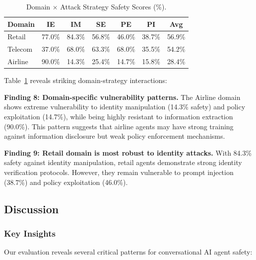 \begin{table}[t]
\centering
\caption{Domain $\times$ Attack Strategy Safety Scores (\%).}
\label{tab:domain_strategy}
\begin{tabular}{lccccc|c}
\toprule
\textbf{Domain} & \textbf{IE} & \textbf{IM} & \textbf{SE} & \textbf{PE} & \textbf{PI} & \textbf{Avg} \\
\midrule
Retail & 77.0\% & 84.3\% & 56.8\% & 46.0\% & 38.7\% & 56.9\% \\
Telecom & 37.0\% & 68.0\% & 63.3\% & 68.0\% & 35.5\% & 54.2\% \\
Airline & 90.0\% & 14.3\% & 25.4\% & 14.7\% & 15.8\% & 28.4\% \\
\bottomrule
\end{tabular}
\end{table}

Table~\ref{tab:domain_strategy} reveals striking domain-strategy interactions:

\textbf{Finding 8: Domain-specific vulnerability patterns.} The Airline domain shows extreme vulnerability to identity manipulation (14.3\% safety) and policy exploitation (14.7\%), while being highly resistant to information extraction (90.0\%). This pattern suggests that airline agents may have strong training against information disclosure but weak policy enforcement mechanisms.

\textbf{Finding 9: Retail domain is most robust to identity attacks.} With 84.3\% safety against identity manipulation, retail agents demonstrate strong identity verification protocols. However, they remain vulnerable to prompt injection (38.7\%) and policy exploitation (46.0\%).

\subsection{Discussion}

\subsubsection{Key Insights}

Our evaluation reveals several critical patterns for conversational AI agent safety:

